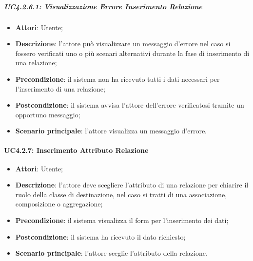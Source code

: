 \subparagraph{UC4.2.6.1: Visualizzazione Errore Inserimento Relazione}
\label{UC4.2.6.1}
\begin{itemize}
\item \textbf{Attori}: Utente;
\item \textbf{Descrizione}: l'attore può visualizzare un messaggio d'errore nel caso si fossero verificati uno o più scenari alternativi durante la fase di inserimento di una relazione;	
\item \textbf{Precondizione}: il sistema non ha ricevuto tutti i dati necessari per l'inserimento di una relazione;	
\item \textbf{Postcondizione}: il sistema avvisa l'attore dell'errore verificatosi tramite un opportuno messaggio;	
\item \textbf{Scenario principale}:
l'attore visualizza un messaggio d'errore.	
\end{itemize}


\paragraph{UC4.2.7: Inserimento Attributo Relazione}
\label{UC4.2.7}
\begin{itemize}
\item \textbf{Attori}: Utente;
\item \textbf{Descrizione}: l'attore deve scegliere l'attributo di una relazione per chiarire il ruolo della classe di destinazione, nel caso si tratti di una associazione, composizione o aggregazione;
\item \textbf{Precondizione}: il sistema visualizza il form per l'inserimento dei dati;
\item \textbf{Postcondizione}: il sistema ha ricevuto il dato richiesto;
\item \textbf{Scenario principale}:
l'attore sceglie l'attributo della relazione.
\end{itemize}

